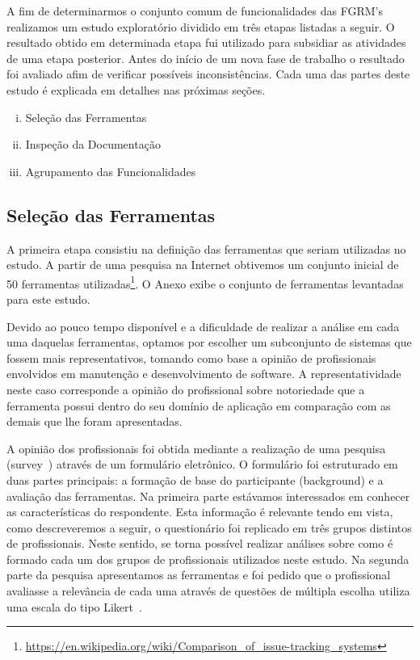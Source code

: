 A fim de determinarmos o conjunto comum de funcionalidades das FGRM's realizamos
um estudo exploratório dividido em três etapas listadas a seguir. O resultado
obtido em determinada etapa fui utilizado para subsidiar as atividades de uma
etapa posterior. Antes do início de um nova fase de trabalho o resultado foi
avaliado afim de verificar possíveis inconsistências. Cada uma das partes deste
estudo é explicada em detalhes nas próximas seções.

\begin{enumerate}[(i)]
	\item Seleção das Ferramentas
	\item Inspeção da Documentação
	\item Agrupamento das Funcionalidades
\end{enumerate}

\subsection{Seleção das Ferramentas}
\label{subsec:selecao-ferramentas}

A primeira etapa consistiu na definição das ferramentas que seriam utilizadas no
estudo. A partir de uma pesquisa na Internet obtivemos um conjunto inicial de 50
ferramentas
utilizadas\footnote{\url{https://en.wikipedia.org/wiki/Comparison_of_issue-tracking_systems}}.
O Anexo exibe o conjunto de ferramentas levantadas para este estudo.

Devido ao pouco tempo disponível e a dificuldade de realizar a análise em cada
uma daquelas ferramentas, optamos por escolher um subconjunto de sistemas que
fossem mais representativos, tomando como base a opinião de profissionais
envolvidos em manutenção e desenvolvimento de software. A representatividade
neste caso corresponde a opinião do profissional sobre notoriedade que a
ferramenta possui dentro do seu domínio de aplicação em comparação com as demais
que lhe foram apresentadas.

A opinião dos profissionais foi obtida mediante a realização de uma pesquisa
(survey~\cite{wohlin2012experimentation}) através de um formulário eletrônico.
O formulário foi estruturado em duas partes principais: a formação de base do
participante (background) e a avaliação das ferramentas. Na primeira parte
estávamos interessados em conhecer as características do respondente. Esta
informação é relevante tendo em vista, como descreveremos a seguir, o
questionário foi replicado em três grupos distintos de profissionais. Neste
sentido, se torna possível realizar análises sobre como é formado cada um dos
grupos de profissionais utilizados neste estudo. Na segunda parte da pesquisa
apresentamos as ferramentas e foi pedido que o profissional avaliasse a
relevância de cada uma através de questões de múltipla escolha utiliza uma
escala do tipo Likert~\cite{robbins2011plotting}.

